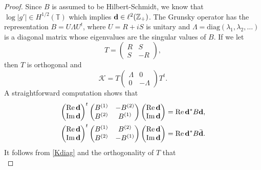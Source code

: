 \documentclass{article}
\numberwithin{equation}{section}
\numberwithin{figure}{section}
\theoremstyle{plain}
\theoremstyle{plain}
\numberwithin{thm}{section}
\theoremstyle{remark}
\newcommand{\re}{\text{{\rm Re}\,}}
\newcommand{\im}{\text{{\rm Im}\,}}
\newcommand{\T}{\mathbb{T}}
\newcommand{\Z}{\mathbb{Z}}
\begin{document}
\begin{proof}
 Since $B$ is assumed to be Hilbert-Schmidt, we know that $\log|g'| \in H^{1/2}(\T)$ which implies ${\bf d} \in \ell^2(\Z_+)$. The Grunsky operator has the representation $B=U\Lambda U^t$, where $U=R+iS$ is unitary and $\Lambda=\text{diag}(\lambda_1,\lambda_2,\dots)$ is a diagonal matrix whose eigenvalues are the singular values of $B$. If we let
 \begin{equation*}
     T=\begin{pmatrix}
         R  &S \\ S &-R
     \end{pmatrix},
 \end{equation*}
 then $T$ is orthogonal and 
 \begin{equation}\label{Kdiag}
     \mathcal{K}=T\begin{pmatrix}
         \Lambda & 0 \\  0 & -\Lambda
     \end{pmatrix}T^t.
 \end{equation}
A straightforward computation shows that
\begin{align}
    \begin{pmatrix}
     \re {\bf d} \\ \im {\bf d}
 \end{pmatrix} ^t \begin{pmatrix}
     B^{(1)}  &-B^{(2)} \\  B^{(2)} & B^{(1)}
 \end{pmatrix}\begin{pmatrix}
     \re {\bf d} \\ \im {\bf d}
 \end{pmatrix} &=\re {\bf d}^*B{\bf d},\label{RedBd} \\
 \begin{pmatrix}
     \re {\bf d} \\ \im {\bf d}
 \end{pmatrix} ^t \begin{pmatrix}
     B^{(1)} &  B^{(2)} \\  B^{(2)}  &- B^{(1)}
 \end{pmatrix}\begin{pmatrix}
     \re {\bf d} \\ \im {\bf d}
 \end{pmatrix} &=\re {\bf d}^*B\bar{{\bf d}}\label{RedBd2}.
\end{align}
It follows from \eqref{Kdiag} and the orthogonality of $T$ that
\begin{equation*}

\end{equation*}
\end{proof}
\end{document}
